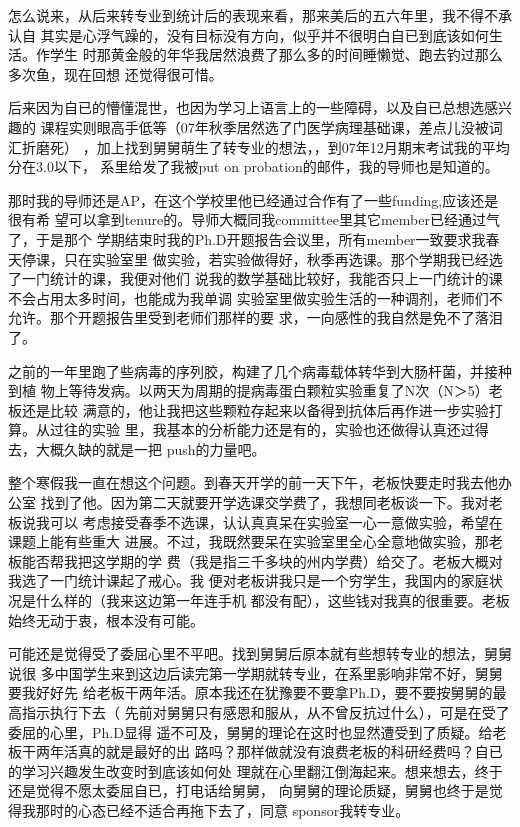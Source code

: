 \documentclass[12pt]{book}
\begin{document}
怎么说来，从后来转专业到统计后的表现来看，那来美后的五六年里，我不得不承认自
其实是心浮气躁的，没有目标没有方向，似乎并不很明白自已到底该如何生活。作学生
时那黄金般的年华我居然浪费了那么多的时间睡懒觉、跑去钓过那么多次鱼，现在回想
还觉得很可惜。

后来因为自已的懵懂混世，也因为学习上语言上的一些障碍，以及自已总想选感兴趣的
课程实则眼高手低等（07年秋季居然选了门医学病理基础课，差点儿没被词汇折磨死）
，加上找到舅舅萌生了转专业的想法，，到07年12月期末考试我的平均分在3.0以下，
系里给发了我被put on probation的邮件，我的导师也是知道的。

那时我的导师还是AP，在这个学校里他已经通过合作有了一些funding,应该还是很有希
望可以拿到tenure的。导师大概同我committee里其它member已经通过气了，于是那个
学期结束时我的Ph.D开题报告会议里，所有member一致要求我春天停课，只在实验室里
做实验，若实验做得好，秋季再选课。那个学期我已经选了一门统计的课，我便对他们
说我的数学基础比较好，我能否只上一门统计的课不会占用太多时间，也能成为我单调
实验室里做实验生活的一种调剂，老师们不允许。那个开题报告里受到老师们那样的要
求，一向感性的我自然是免不了落泪了。

之前的一年里跑了些病毒的序列胶，构建了几个病毒载体转华到大肠杆菌，并接种到植
物上等待发病。以两天为周期的提病毒蛋白颗粒实验重复了N次（N＞5）老板还是比较
满意的，他让我把这些颗粒存起来以备得到抗体后再作进一步实验打算。从过往的实验
里，我基本的分析能力还是有的，实验也还做得认真还过得去，大概久缺的就是一把
push的力量吧。

整个寒假我一直在想这个问题。到春天开学的前一天下午，老板快要走时我去他办公室
找到了他。因为第二天就要开学选课交学费了，我想同老板谈一下。我对老板说我可以
考虑接受春季不选课，认认真真呆在实验室一心一意做实验，希望在课题上能有些重大
进展。不过，我既然要呆在实验室里全心全意地做实验，那老板能否帮我把这学期的学
费（我是指三千多块的州内学费）给交了。老板大概对我选了一门统计课起了戒心。我
便对老板讲我只是一个穷学生，我国内的家庭状况是什么样的（我来这边第一年连手机
都没有配），这些钱对我真的很重要。老板始终无动于衷，根本没有可能。

可能还是觉得受了委屈心里不平吧。找到舅舅后原本就有些想转专业的想法，舅舅说很
多中国学生来到这边后读完第一学期就转专业，在系里影响非常不好，舅舅要我好好先
给老板干两年活。原本我还在犹豫要不要拿Ph.D，要不要按舅舅的最高指示执行下去（
先前对舅舅只有感恩和服从，从不曾反抗过什么），可是在受了委屈的心里，Ph.D显得
遥不可及，舅舅的理论在这时也显然遭受到了质疑。给老板干两年活真的就是最好的出
路吗？那样做就没有浪费老板的科研经费吗？自已的学习兴趣发生改变时到底该如何处
理就在心里翻江倒海起来。想来想去，终于还是觉得不愿太委屈自已，打电话给舅舅，
向舅舅的理论质疑，舅舅也终于是觉得我那时的心态已经不适合再拖下去了，同意
sponsor我转专业。
\end{document}
